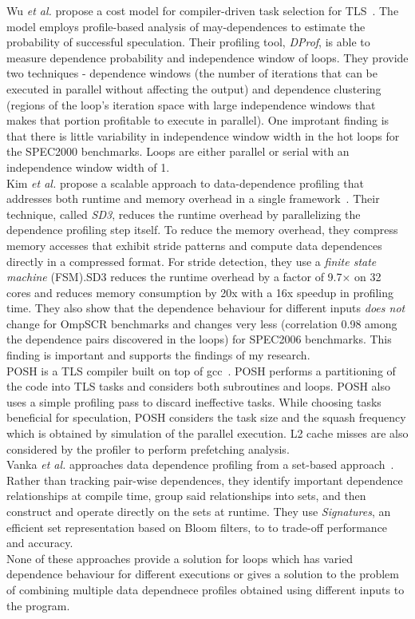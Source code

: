 \documentclass[10pt]{report}          %
\begin{document}
Wu \textit{et al.} propose a cost model for compiler-driven task selection for TLS~\cite{dprof}.  The model employs profile-based analysis of may-dependences to estimate the probability of successful speculation.  Their profiling tool, \textit{DProf}, is able to  measure dependence probability and independence window of loops. They provide two techniques - dependence windows (the number of iterations that can be executed in parallel without affecting the output) and dependence clustering (regions of the loop's iteration space with large independence windows that makes that portion profitable to execute in parallel).  One improtant finding is that there is little variability in independence window width in the hot loops for the SPEC2000 benchmarks. Loops are either parallel or serial with an independence window width of 1.\\
Kim \textit{et al.} propose a scalable approach to data-dependence profiling that addresses both runtime and memory overhead in a single framework~\cite{sd3}.  Their technique, called \textit{SD3}, reduces the runtime overhead by parallelizing the dependence profiling step itself. To reduce the memory overhead, they compress memory accesses that exhibit stride patterns and compute data dependences directly in a compressed format. For stride detection, they use a \textit{finite state machine} (FSM).SD3 reduces the runtime overhead by a factor of  9.7× on  32 cores and reduces memory consumption by 20x with a 16x speedup in profiling time.  They also show that the dependence behaviour for different inputs \textit{does not} change for OmpSCR benchmarks and changes very less (correlation 0.98 among the dependence pairs discovered in the loops) for SPEC2006 benchmarks.  This finding is important and supports the findings of my research.\\
POSH is a TLS compiler built on top of gcc~\cite{posh}. POSH performs a partitioning of the code into TLS tasks and considers both subroutines and loops. POSH also uses a simple profiling pass to discard ineffective tasks.  While choosing tasks beneficial for speculation, POSH considers the task size and the squash frequency which is obtained by simulation of the parallel execution.  L2 cache misses are also considered by the profiler to perform prefetching analysis.\\
Vanka \textit{et al.} approaches data dependence profiling from a set-based approach~\cite{vanka}.  Rather than tracking pair-wise dependences, they identify important dependence relationships at compile time, group said relationships into sets, and then construct and operate directly on the sets at runtime.  They use \textit{Signatures}, an efficient set representation based on Bloom filters, to to trade-off performance and accuracy.\\
None of these approaches provide a solution for loops which has varied dependence behaviour for different executions or gives a solution to the problem of combining multiple data dependnece profiles obtained using different inputs to the program.
\end{document}
